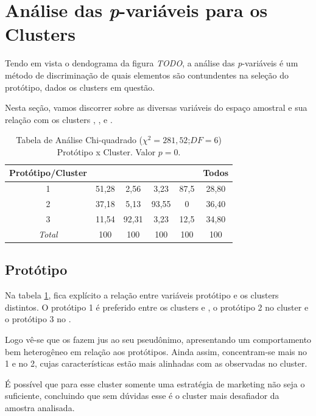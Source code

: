 \section{Análise das \emph{p}-variáveis para os Clusters}

Tendo em vista o dendograma da figura \emph{TODO}, a análise das \emph{p}-variáveis
é um método de discriminação de quais elementos são contundentes na
seleção do protótipo, dados os clusters em questão. 

Nesta seção, vamos discorrer sobre as diversas variáveis do espaço
amostral e sua relação com os clusters \nomeCa{}, \nomeCb{}, \nomeCc{}
e \nomeCd{}.
\begin{table}
\begin{centering}
\begin{tabular}{c|c|c|c|c|c}
\hline 
Protótipo/Cluster & \nomeCa{} & \nomeCb{} & \nomeCc{} & \nomeCd{} & Todos\tabularnewline
\hline 
1 & 51,28 & 2,56 & 3,23 & 87,5 & 28,80\tabularnewline
\hline 
2 & 37,18 & 5,13 & 93,55 & 0 & 36,40\tabularnewline
\hline 
3 & 11,54 & 92,31 & 3,23 & 12,5 & 34,80\tabularnewline
\hline 
\emph{Total} & 100 & 100 & 100 & 100 & 100\tabularnewline
\hline 
\end{tabular}
\par\end{centering}

\caption{\label{tab:prototipo-vs-cluster}Tabela de Análise Chi-quadrado ($\chi^{2}=281,52$;$DF=6$)
Protótipo x Cluster. Valor $p=0$.}
\end{table}

\subsection{Protótipo}

Na tabela \ref{tab:prototipo-vs-cluster}, fica explícito a relação
entre variáveis protótipo e os clusters distintos. O protótipo 1 é
preferido entre os clusters \emph{\nomeCa{}} e \emph{\nomeCd{}},
o protótipo 2 no cluster \emph{\nomeCc{}} e o protótipo 3 no \emph{\nomeCb{}}.

Logo vê-se que os \nomeCa{} fazem jus ao seu pseudônimo, apresentando
um comportamento bem heterogêneo em relação aos protótipos. Ainda
assim, concentram-se mais no 1 e no 2, cujas características estão
mais alinhadas com as observadas no cluster. 

É possível que para esse cluster somente uma estratégia de marketing
não seja o suficiente, concluindo que sem dúvidas esse é o cluster
mais desafiador da amostra analisada.

